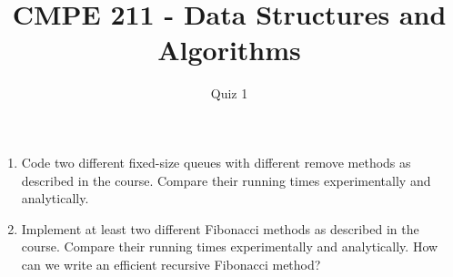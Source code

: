 \documentclass{article}
\begin{document}
\author{Quiz 1}
\title{CMPE 211 - Data Structures and Algorithms}




\date{}
\maketitle
\setcounter{secnumdepth}{0}
\begin{enumerate}
\item Code two different fixed-size queues with different remove methods as described in the course. Compare their running times experimentally and analytically.
\item Implement at least two different Fibonacci methods as described in the course. Compare their running times experimentally and analytically. How can we write an efficient recursive Fibonacci method?

\end{enumerate}
\end{document}
